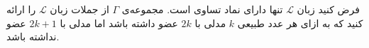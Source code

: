 فرض کنید زبان
$\mathcal{L}$
تنها دارای نماد تساوی است. مجموعه‌ی $\Gamma$ از جملات زبان $\mathcal{L}$ را ارائه کنید که به ازای هر عدد طبیعی $k$ مدلی با $2k$ عضو داشته باشد اما مدلی با $2k+1$ عضو نداشته باشد.

